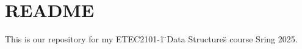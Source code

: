 \chapter{README}
\hypertarget{md__r_e_a_d_m_e}{}\label{md__r_e_a_d_m_e}
This is our repository for my ETEC2101-\/1 \"{}\+Data Structures\"{} course Sring 2025. 